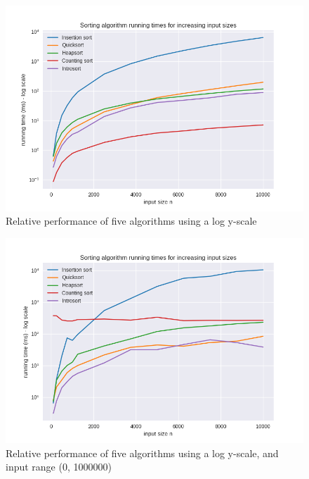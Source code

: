 \documentclass[12pt, a4paper]{article}
\begin{document}
\begin{figure}
    \includegraphics[width=\linewidth]{bm_output/plot_0_log_20210513-101605.png}
    \caption{Relative performance of five algorithms using a log y-scale}
    \label{fig:log}
\end{figure}


\begin{figure}
    \includegraphics[width=\linewidth]{bm_output/plot_0_log_20210514-033420.png}
    \caption{Relative performance of five algorithms using a log y-scale, and input range (0, 1000000)}
    \label{fig:range}
\end{figure}
\end{document}
